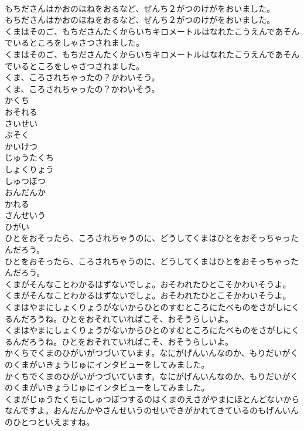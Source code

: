 \documentclass[8pt]{extreport}
\begin{document}
\begin{CJK}{UTF8}{min}
\\	もちださんはかおのほねをおるなど、ぜんち２がつのけがをおいました。
\\	もちださんはかおのほねをおるなど、ぜんち２がつのけがをおいました。
\\	くまはそのご、もちださんたくからいちキロメートルはなれたこうえんであそんでいるところをしゃさつされました。
\\	くまはそのご、もちださんたくからいちキロメートルはなれたこうえんであそんでいるところをしゃさつされました。
\\	くま、ころされちゃったの？かわいそう。
\\	くま、ころされちゃったの？かわいそう。
\\	かくち
\\	おそれる
\\	さいせい
\\	ぶそく
\\	かいけつ
\\	じゅうたくち
\\	しょくりょう
\\	しゅつぼつ
\\	おんだんか
\\	かれる
\\	さんせいう
\\	ひがい
\\	ひとをおそったら、ころされちゃうのに、どうしてくまはひとをおそっちゃったんだろう。
\\	ひとをおそったら、ころされちゃうのに、どうしてくまはひとをおそっちゃったんだろう。
\\	くまがそんなことわかるはずないでしょ。おそわれたひとこそかわいそうよ。
\\	くまがそんなことわかるはずないでしょ。おそわれたひとこそかわいそうよ。
\\	くまはやまにしょくりょうがないからひとのすむところにたべものをさがしにくるんだろうね。ひとをおそれていればこそ、おそうらしいよ。
\\	くまはやまにしょくりょうがないからひとのすむところにたべものをさがしにくるんだろうね。ひとをおそれていればこそ、おそうらしいよ。
\\	かくちでくまのひがいがつづいています。なにがげんいんなのか、もりだいがくのくまがいきょうじゅにインタビューをしてみました。
\\	かくちでくまのひがいがつづいています。なにがげんいんなのか、もりだいがくのくまがいきょうじゅにインタビューをしてみました。
\\	くまがじゅうたくちにしゅつぼつするのはくまのえさがやまにほとんどないからなんですよ。おんだんかやさんせいうのせいできがかれてきているのもげんいんのひとつといえますね。

\end{CJK}
\end{document}
